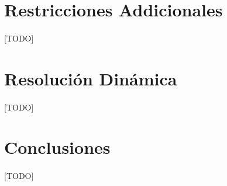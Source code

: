 \documentclass{subfiles}
\begin{document}
    \section{Restricciones Addicionales}
    \label{sec:formulation_aditional_restrictions}

      \paragraph{}
      [TODO]

    \section{Resolución Dinámica}
    \label{sec:formulation_dynamic_solving}

      \paragraph{}
      [TODO]

    \section{Conclusiones}
    \label{sec:formulation_conclusions}

      \paragraph{}
      [TODO]
\end{document}
